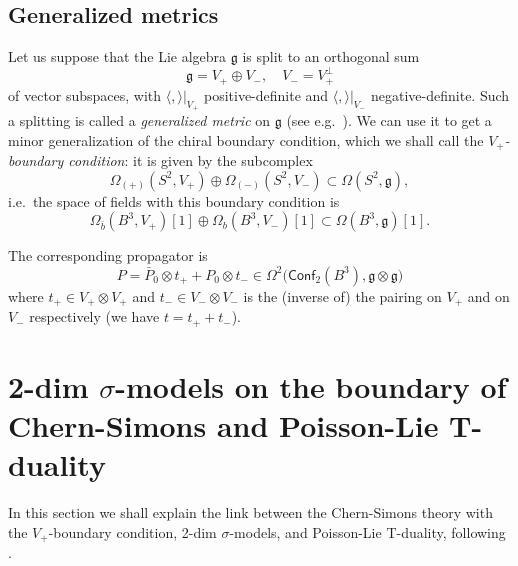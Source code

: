 \documentclass[a4paper]{amsart}
\theoremstyle{plain}
\theoremstyle{definition}
\newcommand{\g}{\mathfrak{g}}
\newcommand{\la}{\langle}
\newcommand{\ra}{\rangle}
\newcommand{\cf}{\mathsf{Conf}}
\begin{document}
\subsection{Generalized metrics}\label{sec:gm}
Let us suppose that the Lie algebra $\g$ is split to an orthogonal sum
$$\g=V_+\oplus V_-,\quad V_-=V_+^\perp$$
of vector subspaces, with $\la,\ra|_{V_+}$ positive-definite and $\la,\ra|_{V_-}$ negative-definite. Such a splitting is called a \emph{generalized metric}  on $\g$ (see e.g.\ \cite{Gu}). We can use it to get  a minor generalization of the chiral boundary condition, which we shall call the \emph{$V_+$-boundary condition}: it is given by the subcomplex
$$\Omega_{(+)}(S^2,V_+) \oplus \Omega_{(-)}(S^2,V_-) \subset\Omega(S^2,\g),$$
i.e.\ the  space of fields with this boundary condition is
$$\Omega_{\bar b}(B^3,V_+)[1] \oplus \Omega_{ b}(B^3,V_-)[1]\subset \Omega(B^3,\g)[1].
$$

The corresponding propagator is
\begin{equation}\label{gmprop}
P=\bar P_0\otimes t_+ +  P_0\otimes t_-\in \Omega^2\bigl(\cf_2(B^3),\g\otimes\g\bigr)
\end{equation}
where $t_+\in V_+\otimes V_+$ and $t_-\in V_-\otimes V_-$ is the (inverse of) the pairing on $V_+$ and on $V_-$ respectively (we have $t = t_+ + t_-$).



\section{2-dim $\sigma$-models on the boundary of Chern-Simons and Poisson-Lie T-duality}\label{sec:PL}

In this section we shall explain the link between the Chern-Simons theory with the $V_+$-boundary condition, 2-dim $\sigma$-models, and Poisson-Lie T-duality, following \cite{PSV,S}.
\end{document}
